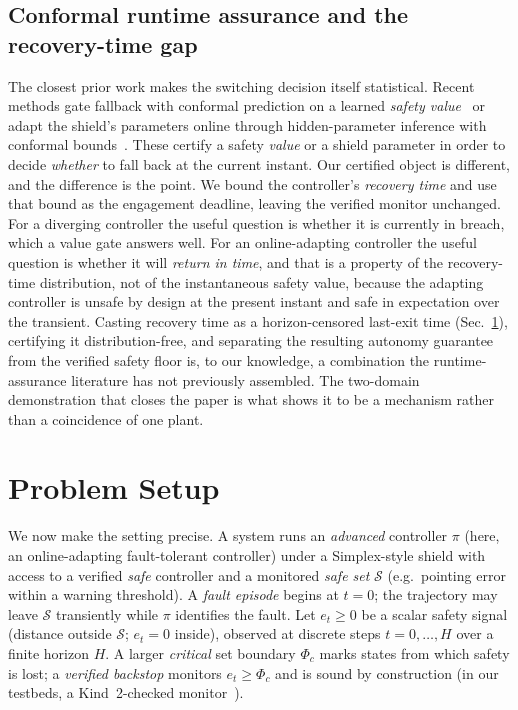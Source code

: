 \documentclass[journal]{IEEEtran}
\theoremstyle{plain}
\theoremstyle{definition}
\newcommand{\Sset}{\mathcal{S}}
\begin{document}
\subsection{Conformal runtime assurance and the recovery-time gap} The closest prior work
makes the switching decision itself statistical. Recent methods gate fallback with conformal
prediction on a learned \emph{safety value}~\cite{Tabbara2025} or adapt the shield's
parameters online through hidden-parameter inference with conformal bounds~\cite{Kwon2025}.
These certify a safety \emph{value} or a shield parameter in order to decide \emph{whether}
to fall back at the current instant. Our certified object is different, and the difference is
the point. We bound the controller's \emph{recovery time} and use that bound as the
engagement deadline, leaving the verified monitor unchanged. For a diverging controller the
useful question is whether it is currently in breach, which a value gate answers well. For an
online-adapting controller the useful question is whether it will \emph{return in time}, and
that is a property of the recovery-time distribution, not of the instantaneous safety value,
because the adapting controller is unsafe by design at the present instant and safe in
expectation over the transient. Casting recovery time as a horizon-censored last-exit time
(Sec.~\ref{sec:setup}), certifying it distribution-free,
and separating the resulting autonomy guarantee from the verified safety floor is, to our
knowledge, a combination the runtime-assurance literature has not previously assembled. The
two-domain demonstration that closes the paper is what shows it to be a mechanism rather than
a coincidence of one plant.

\section{Problem Setup}
\label{sec:setup}
We now make the setting precise. A system runs an \emph{advanced} controller $\pi$ (here, an
online-adapting fault-tolerant controller) under a Simplex-style shield with access to a
verified \emph{safe} controller
and a monitored \emph{safe set} $\Sset$ (e.g.\ pointing error within a warning threshold).
A \emph{fault episode} begins at $t=0$; the trajectory may leave $\Sset$ transiently while
$\pi$ identifies the fault. Let $e_t \ge 0$ be a scalar safety signal (distance outside
$\Sset$; $e_t=0$ inside), observed at discrete steps $t=0,\dots,H$ over a finite horizon
$H$. A larger \emph{critical} set boundary $\Phi_c$ marks states from which safety is lost;
a \emph{verified backstop} monitors $e_t \ge \Phi_c$ and is sound by construction (in our
testbeds, a Kind~2-checked monitor~\cite{Champion2016}).
\end{document}
